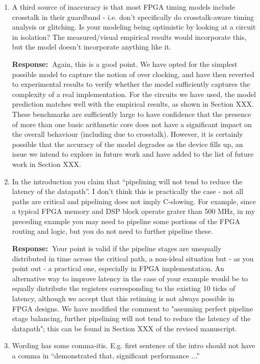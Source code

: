 \documentclass[a4paper, 11pt]{article}
\def\Response{\noindent \textbf{Response:~}}
\newcommand{\Question}[1]{\textcolor[rgb]{0.51,0.00,0.00}{#1}}
\begin{document}
\begin{enumerate}
  \item \Question{A third source of inaccuracy is that most FPGA timing models include crosstalk in their guardband - i.e. don't specifically do crosstalk-aware timing analysis or glitching.  Is your modeling being optimistic by looking at a circuit in isolation?  The measured/visual empirical results would incorporate this, but the model doesn't incorporate anything like it.}
      
      \Response Again, this is a good point. We have opted for the simplest possible model to capture the notion of over clocking, and have then reverted to experimental results to verify whether the model sufficiently captures the complexity of a real implementation. For the circuits we have used, the model prediction matches well with the empirical results, as shown in Section XXX. These benchmarks are sufficiently large to have confidence that the presence of more than one basic arithmetic core does not have a significant impact on the overall behaviour (including due to crosstalk). However, it is certainly possible that the accuracy of the model degrades as the device fills up, an issue we intend to explore in future work and have added to the list of future work in Section XXX.

  \item \Question{In the introduction you claim that ``pipelining will not tend to reduce the latency of the datapath''. I don't think this is practically the case - not all paths are critical and pipelining does not imply C-slowing. For example, since a typical FPGA memory and DSP block operate grater than 500 MHz, in my preceding example you may need to pipeline some portions of the FPGA routing and logic, but you do not need to further pipeline these.}
      
      \Response Your point is valid if the pipeline stages are unequally distributed in time across the critical path, a non-ideal situation but - as you point out - a practical one, especially in FPGA implementation. An alternative way to improve latency in the case of your example would be to equally distribute the registers corresponding to the existing 10 ticks of latency, although we accept that this retiming is not always possible in FPGA designs. We have modified the comment to "assuming perfect pipeline stage balancing, further pipelining will not tend to reduce the latency of the datapath"; this can be found in Section XXX of the revised manuscript.
  
  \item \Question{Wording has some comma-itis. E.g. first sentence of the intro should not have a comma in ``demonstrated that, significant performance ...''}
      

\end{enumerate}
\end{document}
